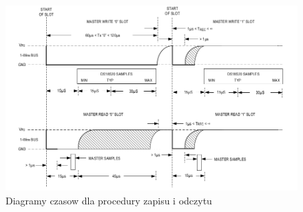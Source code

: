 \documentclass[a4paper]{article}
\begin{document}
\begin{figure}[!h]
\begin{center}
\includegraphics[scale=0.5]{graphics/slots.png}
\end{center}
\label{slotsitming}
\caption{Diagramy czasow dla procedury zapisu i odczytu}
\end{figure}
\end{document}
